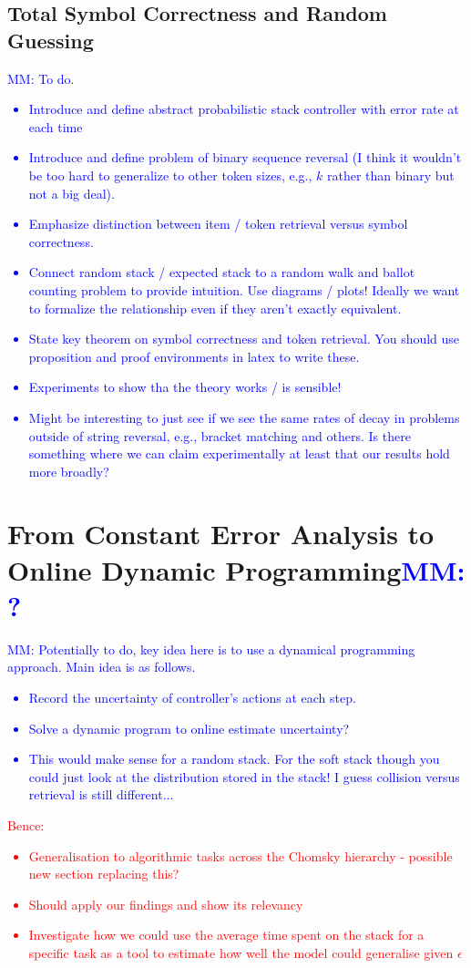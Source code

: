 \documentclass[10pt]{article} %
\newcommand{\mm}[1]{\textcolor{blue}{MM: #1}}
\newcommand{\bence}[1]{\textcolor{red}{Bence: #1}}
\begin{document}
\subsection{Total Symbol Correctness and Random Guessing}


\mm{To do.
\begin{itemize}
    \item Introduce and define abstract probabilistic stack controller with error rate at each time
    \item Introduce and define problem of binary sequence reversal (I think it wouldn't be too hard to generalize to other token sizes, e.g., $k$ rather than binary but not a big deal).
    \item Emphasize distinction between item / token retrieval versus symbol correctness.
    \item Connect random stack / expected stack to a random walk and ballot counting problem to provide intuition. Use diagrams / plots! Ideally we want to formalize the relationship even if they aren't exactly equivalent.
    \item State key theorem on symbol correctness and token retrieval. You should use proposition and proof environments in latex to write these.
    \item Experiments to show tha the theory works / is sensible!
    \item Might be interesting to just see if we see the same rates of decay in problems outside of string reversal, e.g., bracket matching and others. Is there something where we can claim experimentally at least that our results hold more broadly?
\end{itemize}
}


\section{From Constant Error Analysis to Online Dynamic Programming\mm{?}}
\mm{Potentially to do, key idea here is to use a dynamical programming approach. Main idea is as follows.
\begin{itemize}
    \item Record the uncertainty of controller's actions at each step.
    \item Solve a dynamic program to online estimate uncertainty? 
    \item This would make sense for a random stack. For the soft stack though you could just look at the distribution stored in the stack! I guess collision versus retrieval is still different... 
\end{itemize}
}
\bence{\begin{itemize}
    \item Generalisation to algorithmic tasks across the Chomsky hierarchy - possible new section replacing this?
    \item Should apply our findings and show its relevancy
    \item Investigate how we could use the average time spent on the stack for a specific task as a tool to estimate how well the model could generalise given $\epsilon$
\end{itemize}}
\end{document}
